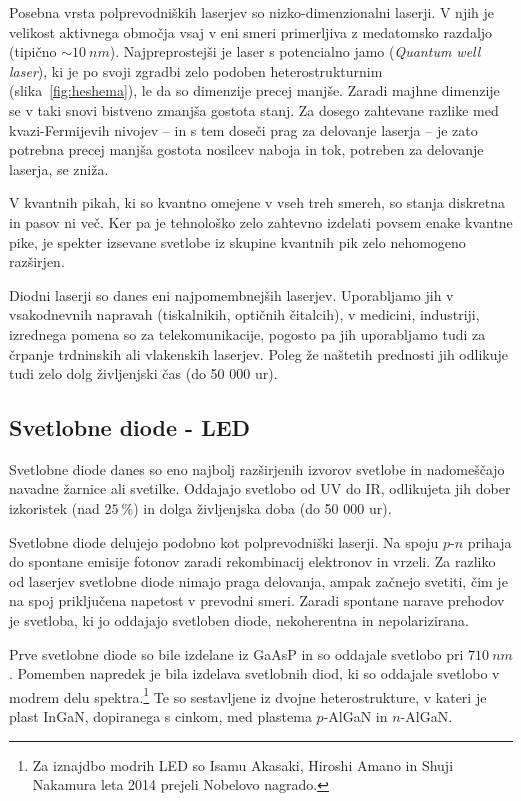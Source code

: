 \begin{remark}
Posebna vrsta polprevodniških laserjev so nizko-dimenzionalni laserji. V njih je 
velikost aktivnega območja vsaj v eni smeri primerljiva z medatomsko razdaljo (tipično $\sim 10~\si{nm}$).
Najpreprostejši je laser s potencialno jamo ({\it Quantum well laser}), ki 
je po svoji zgradbi zelo podoben heterostrukturnim (slika~\ref{fig:heshema}), le da so dimenzije precej
manjše. Zaradi majhne dimenzije se v taki snovi bistveno zmanjša gostota stanj. 
Za dosego zahtevane razlike med kvazi-Fermijevih nivojev -- in s tem doseči prag za delovanje laserja --
je zato potrebna precej manjša gostota nosilcev naboja in tok, potreben za delovanje laserja,
se zniža. 

V kvantnih pikah, ki so kvantno omejene v vseh treh smereh, 
so stanja diskretna in pasov ni več. Ker pa je tehnološko zelo zahtevno izdelati povsem enake
kvantne pike, je spekter izsevane svetlobe iz skupine kvantnih pik zelo nehomogeno razširjen. 
\end{remark}

Diodni laserji so danes eni najpomembnejših laserjev. Uporabljamo jih v vsakodnevnih napravah 
(tiskalnikih, optičnih čitalcih), v medicini, industriji, izrednega
pomena so za telekomunikacije, pogosto pa jih uporabljamo tudi za 
črpanje trdninskih ali vlakenskih laserjev. 
Poleg že naštetih prednosti jih odlikuje tudi zelo dolg življenjski čas (do 50 000 ur). 

\subsection{Svetlobne diode - LED}
Svetlobne diode danes so eno najbolj razširjenih izvorov svetlobe in nadomeščajo
navadne žarnice ali svetilke. Oddajajo svetlobo od UV do IR, odlikujeta jih 
dober izkoristek (nad $25~\%$) in dolga življenjska doba (do 50 000 ur).

Svetlobne diode delujejo podobno kot polprevodniški laserji. Na spoju $p$-$n$ prihaja do 
spontane emisije fotonov zaradi rekombinacij elektronov in vrzeli. Za razliko od laserjev 
svetlobne diode nimajo praga delovanja, ampak začnejo svetiti, čim je na spoj priključena 
napetost v prevodni smeri. Zaradi spontane narave prehodov je svetloba, ki jo oddajajo
svetloben diode, nekoherentna in nepolarizirana. 

Prve svetlobne diode so bile izdelane iz GaAsP in so oddajale 
svetlobo pri $710~\si{nm}$. Pomemben
napredek je bila izdelava svetlobnih diod, ki so oddajale svetlobo v modrem delu 
spektra.\footnote{Za iznajdbo modrih LED so Isamu Akasaki, Hiroshi Amano in 
Shuji Nakamura leta 2014 prejeli Nobelovo nagrado.} Te so sestavljene iz dvojne
heterostrukture, v kateri je plast InGaN, dopiranega s cinkom, 
med plastema $p$-AlGaN in $n$-AlGaN.

